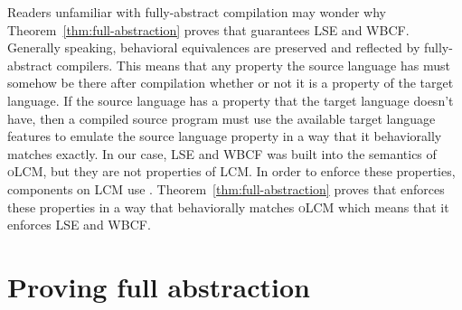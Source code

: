 \documentclass[acmsmall,review,anonymous]{acmart}\settopmatter{printfolios=true,printccs=false,printacmref=false}
\newcommand{\trgcm}{\textsc{LCM}}
\newcommand{\srccm}{\textsc{oLCM}}
\begin{document}
Readers unfamiliar with fully-abstract compilation may wonder why Theorem~\ref{thm:full-abstraction} proves that \stktokens{} guarantees LSE and WBCF.
Generally speaking, behavioral equivalences are preserved and reflected by fully-abstract compilers.
This means that any property the source language has must somehow be there after compilation whether or not it is a property of the target language.
If the source language has a property that the target language doesn't have, then a compiled source program must use the available target language features to emulate the source language property in a way that it behaviorally matches exactly.
In our case, LSE and WBCF was built into the semantics of \srccm{}, but they are not properties of \trgcm{}.
In order to enforce these properties, components on \trgcm{} use \stktokens{}.
Theorem~\ref{thm:full-abstraction} proves that \stktokens{} enforces these properties in a way that behaviorally matches \srccm{} which means that it enforces LSE and WBCF.




\section{Proving full abstraction}
\label{sec:fa-proof}
\end{document}
